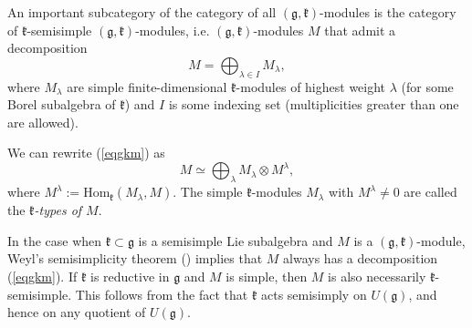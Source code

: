 \documentclass[12pt]{report}
\newcommand{\kk}{\mathfrak{k}}
\newcommand{\gG}{\mathfrak{g}}
\newcommand{\refeq}[1]{(\ref{#1})}
\newcommand{\Hom}{\mathrm{Hom}}
\begin{document}
An important subcategory of the category of all $(\gG,\kk)$-modules is the category of $\kk$-semisimple $(\gG,\kk)$-modules, i.e. $(\gG,\kk)$-modules $M$ that admit a decomposition
\begin{equation}\label{eqgkm}
M=\bigoplus_{\lambda\in I} M_\lambda,
\end{equation}
where  $M_\lambda$ are simple finite-dimensional $\kk$-modules of highest weight $\lambda$ (for some Borel subalgebra of $\kk$) and $I$ is some indexing set (multiplicities greater than one are allowed). %

We can rewrite \refeq{eqgkm} as 
\begin{equation}\label{eqgkm2}
M\simeq \bigoplus_{\lambda} M_\lambda\otimes M^\lambda,
\end{equation}
where $M^\lambda:=\Hom_\kk(M_\lambda,M)$. The simple $\kk$-modules $M_\lambda$ with $M^\lambda\neq 0$ are called the \textit{$\kk$-types of $M$}.

In the case when $\kk\subset\gG$ is a semisimple Lie subalgebra and $M$ is a $(\gG,\kk)$-module, Weyl's semisimplicity theorem (\cite[Ch.~1,\S 6,~Th.~2]{Bourbaki}) implies that $M$ always has a decomposition \refeq{eqgkm}. If $\kk$ is reductive in $\gG$ and $M$ is simple, then $M$ is also necessarily $\kk$-semisimple. This follows from the fact that $\kk$ acts semisimply on $U(\gG)$, and hence on any quotient of $U(\gG)$.
\end{document}
